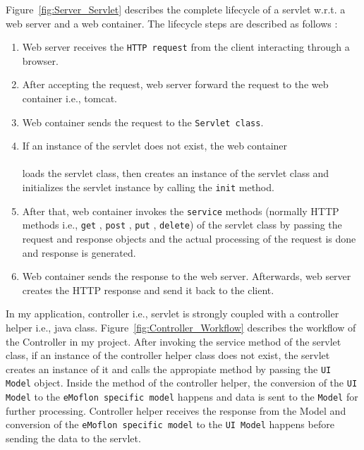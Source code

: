 Figure~\ref{fig:Server_Servlet} describes the complete lifecycle of a servlet w.r.t. a web server and a web container. The lifecycle steps are described as follows \cite{servlet}:
\begin{enumerate}
	\item {Web server receives the \texttt{HTTP request} from the client interacting through a browser.}
	\item {After accepting the request, web server forward the request to the web container i.e., tomcat.}
	\item {Web container sends the request to the \texttt{Servlet class}.}
	\item {If an instance of the servlet does not exist, the web container}\\\\
	loads the servlet class, then creates an instance of the servlet class and initializes the servlet instance by calling the \texttt{init} method.
	\item {After that, web container invokes the \texttt{service} methods (normally HTTP methods i.e., \texttt{get} , \texttt{post} , \texttt{put} , \texttt{delete}) of the servlet class by passing the request and response objects and the actual processing of the request is done and response is generated.}
	\item {Web container sends the response to the web server. Afterwards, web server creates the HTTP response and send it back to the client.}
\end{enumerate}

In my application, controller i.e., servlet is strongly coupled with a controller helper i.e., java class. Figure~\ref{fig:Controller_Workflow} describes the workflow of the Controller in my project. After invoking the service method of the servlet class, if an instance of the controller helper class does not exist, the servlet creates an instance of it and calls the appropiate method by passing the \texttt{UI Model} object. Inside the method of the controller helper, the conversion of the \texttt{UI Model} to the \texttt{eMoflon specific model} happens and data is sent to the \texttt{Model} for further processing. Controller helper receives the response from the Model and conversion of the \texttt{eMoflon specific model} to the \texttt{UI Model} happens before sending the data to the servlet. 

